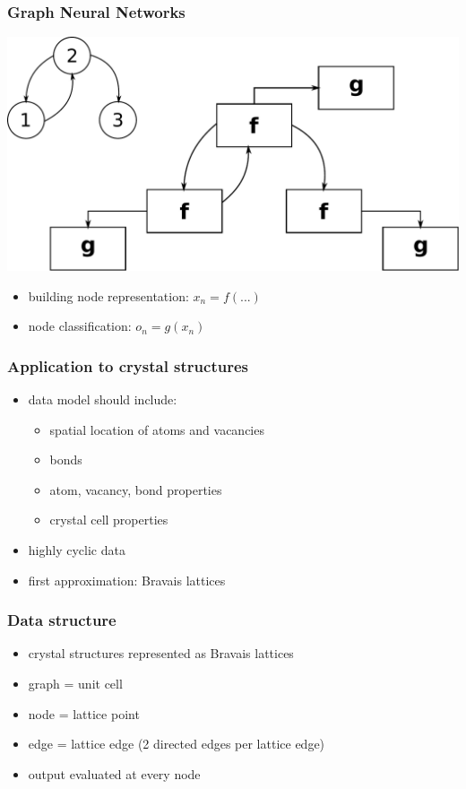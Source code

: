 \documentclass{beamer}
\begin{document}
\begin{frame}
\frametitle{Graph Neural Networks}
\begin{center}
	\includegraphics[scale=0.4]{img/encodinginc}
\end{center}
\begin{itemize}
	\item building node representation: $x_n = f(...)$
	\item node classification: $o_n = g(x_n)$
\end{itemize}
\end{frame}

\begin{frame}
\frametitle{Application to crystal structures}
\begin{itemize}
	\item data model should include: \begin{itemize}
		\item spatial location of atoms and vacancies
		\item bonds
		\item atom, vacancy, bond properties
		\item crystal cell properties
	\end{itemize}
	\item highly cyclic data
	\item first approximation: Bravais lattices
\end{itemize}
\end{frame}


\begin{frame}
\frametitle{Data structure}
\begin{itemize}
	\item crystal structures represented as Bravais lattices
	\item graph = unit cell
	\item node = lattice point
	\item edge = lattice edge (2 directed edges per lattice edge)
	\item output evaluated at every node
\end{itemize}
\end{frame}
\end{document}
